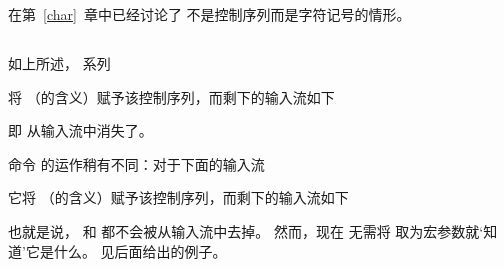 \documentclass{book}
\begin{document}
在第~\ref{char}~章中已经讨论了  不是控制序列而是字符记号的情形。

\subsection{\protect{}}

如上所述， 系列
\begin{disp}%
       \end{disp}
将 （的含义）赋予该控制序列，而剩下的输入流如下 
\begin{disp}\end{disp}
即  从输入流中消失了。

命令  的运作稍有不同：对于下面的输入流
\begin{disp}%
       \end{disp}
它将 （的含义）赋予该控制序列，而剩下的输入流如下
\begin{disp}\end{disp}
也就是说， 和  都不会被从输入流中去掉。
然而，现在  无需将  取为宏参数就`知道'它是什么。
见后面给出的例子。
\end{document}
